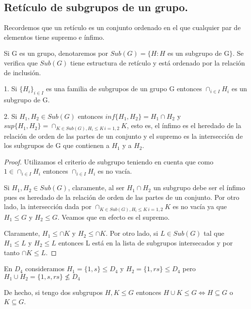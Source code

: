 \subsection{Retículo de subgrupos de un grupo.}

\begin{ndef}
Recordemos que un retículo es un conjunto ordenado en el que cualquier par de elementos tiene supremo e ínfimo.

Si G es un grupo, denotaremos por $Sub(G) = \{H : H$ es un subgrupo de G$\}$. Se verifica que $Sub(G)$ tiene estructura de retículo y está ordenado por la relación de inclusión.
\end{ndef}

\begin{nprop}
1. Si $\{H_i\}_{i \in I}$ es una familia de subgrupos de un grupo G entonces $\cap_{i \in I} H_i$ es un subgrupo de G.

2. Si $H_1,H_2 \in Sub(G)$ entonces $inf\{H_1,H_2\} = H_1 \cap H_2$ y $sup\{H_1,H_2\} = \cap_{K \in Sub(G), H_i \le K \, i = 1,2} K$, esto es, el ínfimo es el heredado de la relación de orden de las partes de un conjunto y el supremo es la intersección de los subgrupos de G que contienen a $H_1$ y a $H_2$.
\end{nprop}

\begin{proof}
Utilizamos el criterio de subgrupo teniendo en cuenta que como $ 1 \in \cap_{i \in I} H_i$ entonces $\cap_{i \in I} H_i$ es no vacía.

Si $H_1,H_2 \in Sub(G)$, claramente, al ser $H_1 \cap H_2$ un subgrupo debe ser el ínfimo pues es heredado de la relación de orden de las partes de un conjunto. Por otro lado, la intersección dada por $\cap_{K \in Sub(G), H_i \le K \, i = 1,2} K$ es no vacía ya que $H_1 \le G$ y $H_2 \le G$. Veamos que en efecto es el supremo.

Claramente, $H_1 \le \cap K$ y $H_2 \le \cap K$. Por otro lado, si $L \in Sub(G)$ tal que $H_1 \le L$ y $H_2 \le L$ entonces L está en la lista de subgrupos intersecados y por tanto $\cap K \le L$.
\end{proof}

\begin{ejemplo}
En $D_4$ consideramos $H_1 = \{1,s\} \le D_4$ y $H_2 = \{1,rs\} \le D_4$ pero 
$H_1 \cup H_2 = \{1,s,rs\} \nleq D_4$

De hecho, si tengo dos subgrupos $H,K \le G$ entonces $H \cup K \le G \iff H \subseteq G$ o $K \subseteq G$.
\end{ejemplo}

